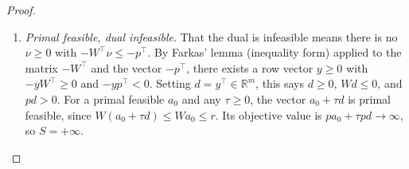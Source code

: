 \begin{proof}
\begin{enumerate}
				To prove the claim, write the system as $Mz \leq b$ with $z = (a, \nu) \geq 0$, where 
				\begin{equation}
					M = \begin{pmatrix} W & 0 \\ 0 & -W^\top \\ -p & r^\top \end{pmatrix}, \qquad 
					b = \begin{pmatrix} r \\ -p^\top \\ 0 \end{pmatrix}.
				\end{equation}
				By Farkas' lemma (inequality form), such a $z$ exists if and only if every \hyperref[lin-def:row-vector]{row vector} $y = (y_1, y_2, t) \geq 0$, with $y_1 \in \mathbb{R}^{1 \times n}$, $y_2 \in \mathbb{R}^{1 \times m}$, $t \in \mathbb{R}$, satisfying $yM \geq 0$ also satisfies $yb \geq 0$. Computing, 
				\begin{equation}
					yM \geq 0 \iff y_1 W \geq tp \;\text{ and }\; W y_2^\top \leq t r, \qquad yb = y_1 r - p y_2^\top.
				\end{equation}
				Let $y \geq 0$ satisfy the left-hand conditions. There are two cases. 
				\begin{itemize}
					\item $t > 0$. Dividing by $t$, the vector $\lambda = y_1/t$ is dual feasible and $a = y_2^\top/t$ is primal feasible. By weak duality, $pa \leq \lambda r$, and multiplying by $t$ gives $y_1 r - p y_2^\top \geq 0$. 
					\item $t = 0$. Then $y_1 W \geq 0$ and $W y_2^\top \leq 0$. Using $y_1 \geq 0$, $Wa_0 \leq r$, $a_0 \geq 0$,
						\begin{equation}
							y_1 r \geq y_1 W a_0 \geq 0.
						\end{equation}
						Using $y_2 \geq 0$, $\lambda_0 W \geq p$, $\lambda_0 \geq 0$,
						\begin{equation}
							p y_2^\top \leq \lambda_0 W y_2^\top \leq 0.
						\end{equation}
						Together, $y_1 r - p y_2^\top \geq 0$.
				\end{itemize}
				This proves the claim. 

			\item \textit{Primal feasible, dual infeasible}. That the dual is infeasible means there is no $\nu \geq 0$ with $-W^\top \nu \leq -p^\top$. By Farkas' lemma (inequality form) applied to the matrix $-W^\top$ and the vector $-p^\top$, there exists a row vector $y \geq 0$ with $-yW^\top \geq 0$ and $-yp^\top < 0$. Setting $d = y^\top \in \mathbb{R}^m$, this says $d \geq 0$, $Wd \leq 0$, and $pd > 0$. For a primal feasible $a_0$ and any $\tau \geq 0$, the vector $a_0 + \tau d$ is primal feasible, since $W(a_0 + \tau d) \leq Wa_0 \leq r$. Its objective value is $pa_0 + \tau pd \to \infty$, so $S = +\infty$. 


\end{enumerate}
\end{proof}
